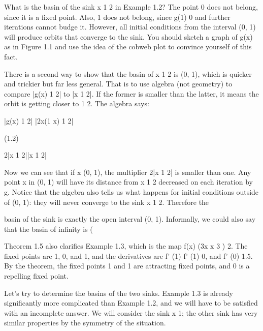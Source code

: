 \documentclass[12pt]{article}
\begin{document}
What is the basin of the sink x  1  2 in Example 1.2? The point 0 does not belong, since it is a ﬁxed 
point. Also, 1 does not belong, since g(1)  0 and further iterations cannot budge it. However, all initial 
conditions from the interval (0, 1) will produce orbits that converge to the sink. You should sketch a 
graph of g(x) as in Figure 1.1 and use the idea of the cobweb plot to convince yourself of this fact.

There is a second way to show that the basin of x  1  2 is (0, 1), which is quicker and trickier but far 
less general. That is to use algebra (not geometry) to compare |g(x)  1  2| to |x  1  2|. If the former is 
smaller than the latter, it means the orbit is getting closer to 1  2. The algebra says:

|g(x)  1  2|  |2x(1  x)  1  2|

(1.2)

 2|x  1  2||x  1  2|

Now we can see that if x  (0, 1), the multiplier 2|x  1  2| is smaller than one. Any point x in (0, 1) will 
have its distance from x  1  2 decreased on each iteration by g. Notice that the algebra also tells us what 
happens for initial conditions outside of (0, 1): they will never converge to the sink x  1  2. Therefore 
the


basin of the sink is exactly the open interval (0, 1). Informally, we could also say that the basin of 
inﬁnity is (


Theorem 1.5 also clariﬁes Example 1.3, which is the map f(x)  (3x  x 3 )  2. The ﬁxed points are 1, 0, 
and 1, and the derivatives are f' (1)  f' (1)  0, and f' (0)  1.5. By the theorem, the ﬁxed points 1 and 1 
are attracting ﬁxed points, and 0 is a repelling ﬁxed point.

Let’s try to determine the basins of the two sinks. Example 1.3 is already signiﬁcantly more complicated 
than Example 1.2, and we will have to be satisﬁed with an incomplete answer. We will consider the sink x  
1; the other sink has very similar properties by the symmetry of the situation.
\end{document}
